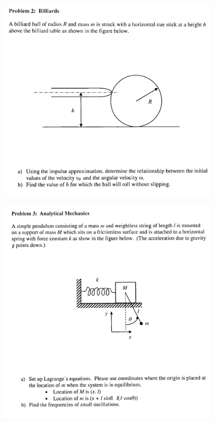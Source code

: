 \documentclass[10pt,a4paper]{article}
\begin{document}
 \newpage
\begin{figure}[H]
 \centering
 \includegraphics[width=16cm]{pdf/1-1T19.png}
\end{figure}
 \newpage
\begin{figure}[H]
 \centering
 \includegraphics[width=16cm]{pdf/1-1T20.png}
\end{figure}
\end{document}
